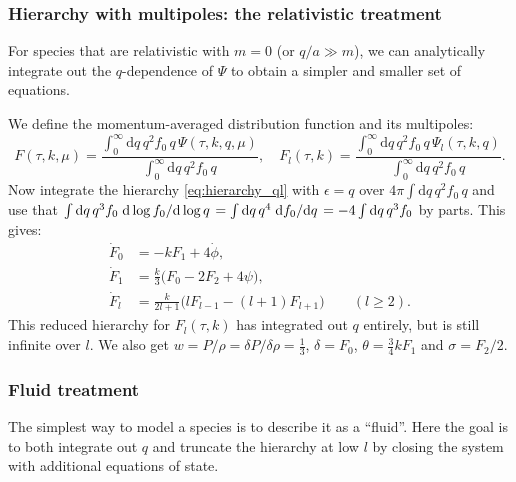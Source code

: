 \documentclass[USenglish, thumbmarks]{uiophdthesis} %
\newcommand\diff{\mathrm{d}}
\begin{document}
\subsubsection{Hierarchy with multipoles: the relativistic treatment}

For species that are relativistic with $m=0$ (or $q/a \gg m$),
we can analytically integrate out the $q$-dependence of $\Psi$
to obtain a simpler and smaller set of equations.

We define the momentum-averaged distribution function and its multipoles:
\begin{equation}
F(\tau, k, \mu) = \frac{\int_0^\infty \diff{q} \, q^2 f_0 \, q \, \Psi(\tau, k, q, \mu)}{\int_0^\infty \diff{q} \, q^2 f_0 \, q} , \quad
F_l(\tau, k) = \frac{\int_0^\infty \diff{q} \, q^2 f_0 \, q \, \Psi_l(\tau, k, q)}{\int_0^\infty \diff{q} \, q^2 f_0 \, q} .
\label{eq:Fl}
\end{equation}
Now integrate the hierarchy \eqref{eq:hierarchy_ql} with $\epsilon=q$ over $4\pi \int \diff{q} \, q^2 f_0 \, q$
and use that $\int \diff{q} \, q^3 f_0 \odv{\log f_0}/{\log q} = \int \diff{q} \, q^4 \odv{f_0}/{q} = -4 \int \diff{q} \, q^3 f_0$ by parts.
This gives:
\begin{subequations}
\label{eq:hierarchy_l}
\begin{align}
\dot{F}_0 &= -k F_1 + 4 \dot{\phi} , \\
\dot{F}_1 &= \frac{k}{3} \big(F_0 - 2 F_2 + 4\psi\big) , \\
\dot{F}_l &= \frac{k}{2l+1} \big(l F_{l-1} - (l+1) F_{l+1}\big) \qquad (l \geq 2) .
\end{align}
\end{subequations}
This reduced hierarchy for $F_l(\tau, k)$
has integrated out $q$ entirely,
but is still infinite over $l$.
We also get $w = P/\rho = \delta P/\delta\rho = \tfrac13$, $\delta = F_0$, $\theta = \tfrac34 k F_1$ and $\sigma = F_2 / 2$.

\subsubsection{Fluid treatment}
\label{sec:fluid}

The simplest way to model a species is to describe it as a \enquote{fluid}.
Here the goal is to both integrate out $q$ and truncate the hierarchy at low $l$
by closing the system with additional equations of state.
\end{document}
